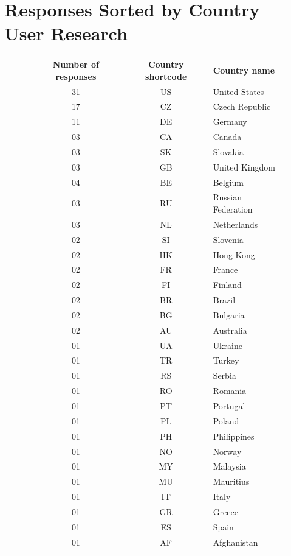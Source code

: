 \documentclass[
  printed, %
  table,   %
  lof,     %
  lot,     %
           oneside, color
]{fithesis3}
\begin{document}
\chapter{Responses Sorted by Country -- User Research}
\vspace{-1em}
\begin{figure}[H]
\center
\begin{footnotesize}
\begin{tabular}{ccl}
\textbf{Number of responses} & \textbf{Country shortcode} & \textbf{Country name} \\
31 & US & United States      \\
17 & CZ & Czech Republic     \\
11 & DE & Germany            \\
03  & CA & Canada             \\
03  & SK & Slovakia           \\
03  & GB & United Kingdom     \\
04  & BE & Belgium            \\
03  & RU & Russian Federation \\
03  & NL & Netherlands        \\
02  & SI & Slovenia           \\
02  & HK & Hong Kong          \\
02  & FR & France             \\
02  & FI & Finland            \\
02  & BR & Brazil             \\
02  & BG & Bulgaria           \\
02  & AU & Australia          \\
01  & UA & Ukraine            \\
01  & TR & Turkey             \\
01  & RS & Serbia             \\
01  & RO & Romania            \\
01  & PT & Portugal           \\
01  & PL & Poland             \\
01  & PH & Philippines        \\
01  & NO & Norway             \\
01  & MY & Malaysia           \\
01  & MU & Mauritius          \\
01  & IT & Italy              \\
01  & GR & Greece             \\
01  & ES & Spain              \\
01  & AF & Afghanistan       
\end{tabular}
\end{footnotesize}
\label{table:countries}
\end{figure}
\end{document}
